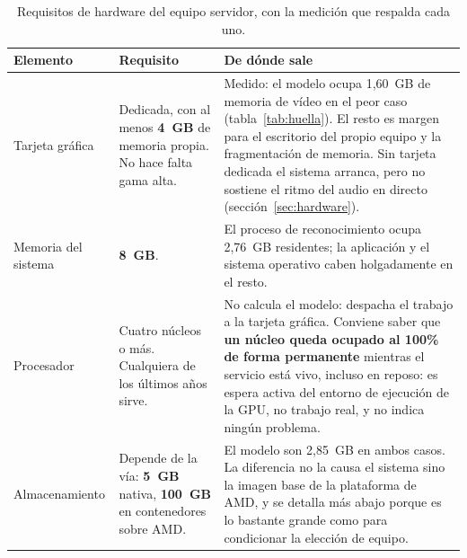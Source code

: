 \begin{table}[!ht]
\centering
\footnotesize
\setlength{\tabcolsep}{4pt}
\begin{tabular}{|p{2.5cm}|p{3.3cm}|p{6.2cm}|}
\hline
\textbf{Elemento} & \textbf{Requisito} & \textbf{De dónde sale} \\
\hline
Tarjeta gráfica &
    Dedicada, con al menos \textbf{4~GB} de memoria propia. No hace falta gama alta. &
    Medido: el modelo ocupa 1,60~GB de memoria de vídeo en el peor caso
    (tabla~\ref{tab:huella}). El resto es margen para el escritorio del propio equipo y la
    fragmentación de memoria. Sin tarjeta dedicada el sistema arranca, pero no sostiene el
    ritmo del audio en directo (sección~\ref{sec:hardware}). \\
\hline
Memoria del sistema &
    \textbf{8~GB}. &
    El proceso de reconocimiento ocupa 2,76~GB residentes; la aplicación y el sistema
    operativo caben holgadamente en el resto. \\
\hline
Procesador &
    Cuatro núcleos o más. Cualquiera de los últimos años sirve. &
    No calcula el modelo: despacha el trabajo a la tarjeta gráfica. Conviene saber que
    \textbf{un núcleo queda ocupado al 100\% de forma permanente} mientras el servicio está
    vivo, incluso en reposo: es espera activa del entorno de ejecución de la GPU, no trabajo
    real, y no indica ningún problema. \\
\hline
Almacenamiento &
    Depende de la vía: \textbf{5~GB} nativa, \textbf{100~GB} en contenedores sobre AMD. &
    El modelo son 2,85~GB en ambos casos. La diferencia no la causa el sistema sino la
    imagen base de la plataforma de AMD, y se detalla más abajo porque es lo bastante grande
    como para condicionar la elección de equipo. \\
\hline
\end{tabular}
\caption{Requisitos de hardware del equipo servidor, con la medición que respalda cada uno.}
\label{tab:requisitos-despliegue}
\end{table}

